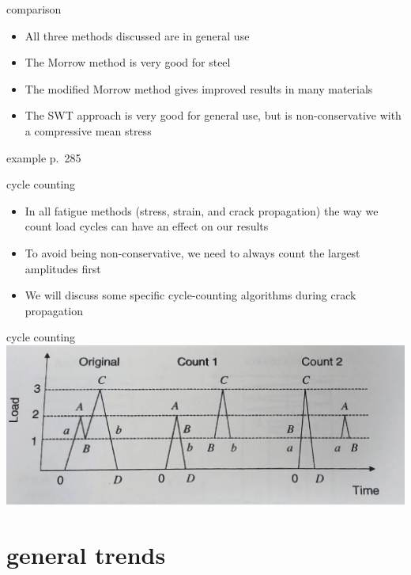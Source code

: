 \documentclass[
  letterpaper,
  ignorenonframetext,
  aspectratio=43,
  handout,
  12pt]{beamer}
\providecommand{\tightlist}{%
  \setlength{\itemsep}{0pt}\setlength{\parskip}{0pt}}
\providecommand{\tightlist}{%
\setlength{\itemsep}{0pt}\setlength{\parskip}{0pt}}
\let\Oldincludegraphics\includegraphics
\renewcommand{\includegraphics}[2][]{\Oldincludegraphics[width=\textwidth,height=0.7\textheight,keepaspectratio]{#2}}
\begin{document}
\begin{frame}{comparison}
\protect\hypertarget{comparison}{}
\begin{itemize}
\tightlist
\item
  All three methods discussed are in general use
\item
  The Morrow method is very good for steel
\item
  The modified Morrow method gives improved results in many materials
\item
  The SWT approach is very good for general use, but is non-conservative
  with a compressive mean stress
\end{itemize}
\end{frame}

\begin{frame}{example p.~285}
\protect\hypertarget{example-p.-285}{}
\end{frame}

\begin{frame}{cycle counting}
\protect\hypertarget{cycle-counting}{}
\begin{itemize}
\tightlist
\item
  In all fatigue methods (stress, strain, and crack propagation) the way
  we count load cycles can have an effect on our results
\item
  To avoid being non-conservative, we need to always count the largest
  amplitudes first
\item
  We will discuss some specific cycle-counting algorithms during crack
  propagation
\end{itemize}
\end{frame}

\begin{frame}{cycle counting}
\protect\hypertarget{cycle-counting-1}{}
\includegraphics{../images/cycle_counting.jpg}
\end{frame}

\hypertarget{general-trends}{%
\section{general trends}\label{general-trends}}
\end{document}
